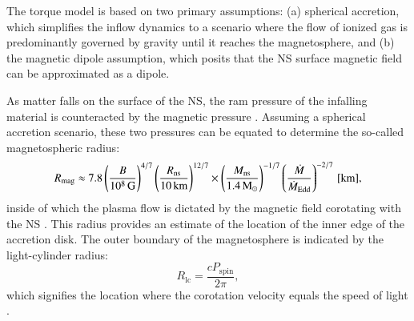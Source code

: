 \documentclass[main.tex]{subfiles}
\begin{document}
    The torque model is based on two primary assumptions: (a) spherical accretion, which simplifies the inflow dynamics to a scenario where the flow of ionized gas is predominantly governed by gravity until it reaches the magnetosphere,
    and (b) the magnetic dipole assumption, which posits that the NS surface magnetic field can be approximated as a dipole.
    
    As matter falls on the surface of the NS, the ram pressure of the infalling material is counteracted by the magnetic pressure \citep[e.g.,][]{1996ApJ...457L..31C}. Assuming a spherical accretion scenario, these two pressures can be equated to determine the so-called magnetospheric radius: 
    \begin{equation}
        \label{eq:rmag}
        R_\mathrm{mag} \approx 7.8 \left(\frac{B}{10^8\,\mathrm{G}}\right)^{4/7} \left(\frac{R_\mathrm{ns}}{10\,\mathrm{km}}\right)^{12/7} \times \left(\frac{M_\mathrm{ns}}{1.4\mathrm{\,M_\odot}}\right)^{-1/7} \left(\frac{\dot{M}}{\dot{M}_\mathrm{Edd}}\right)^{-2/7}\,[\mathrm{km}],
    \end{equation}
    inside of which the plasma flow is dictated by the magnetic field corotating with the NS \citep{10.1111/j.1365-2966.2005.09167.x}. This radius provides an estimate of the location of the inner edge of the accretion disk. The outer boundary of the magnetosphere is indicated by the light-cylinder radius:
    \begin{equation}
        \label{eq:rlc}
        R_\mathrm{lc} = \frac{cP_\mathrm{spin}}{2\pi},
    \end{equation}
    which signifies the location where the corotation velocity equals the speed of light \citep[e.g.,][and references therein]{2004ApJ...606..436R, Tauris:sc2012, 2017ApJ...835....4B}. 
    
\end{document}
